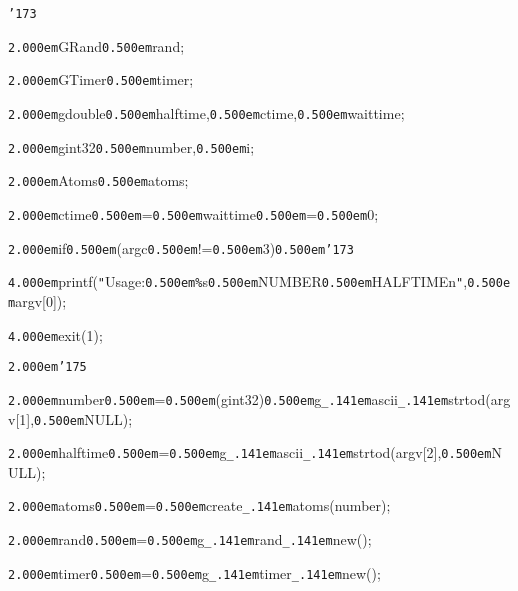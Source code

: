 \noindent
{}{\tt\char'173}

\noindent
{}{\tt\mc \kern2.000em}GRand{\tt\mc \kern0.500em}{\tt *}rand;

\noindent
{}{\tt\mc \kern2.000em}GTimer{\tt\mc \kern0.500em}{\tt *}timer;

\noindent
{}{\tt\mc \kern2.000em}gdouble{\tt\mc \kern0.500em}halftime,{\tt\mc \kern0.500em}ctime,{\tt\mc \kern0.500em}waittime;

\noindent
{}{\tt\mc \kern2.000em}gint32{\tt\mc \kern0.500em}number,{\tt\mc \kern0.500em}i;

\noindent
{}{\tt\mc \kern2.000em}Atoms{\tt\mc \kern0.500em}{\tt *}atoms;

\noindent
{}\hfill

\noindent
{}{\tt\mc \kern2.000em}ctime{\tt\mc \kern0.500em}={\tt\mc \kern0.500em}waittime{\tt\mc \kern0.500em}={\tt\mc \kern0.500em}0;

\noindent
{}\hfill

\noindent
{}{\tt\mc \kern2.000em}if{\tt\mc \kern0.500em}(argc{\tt\mc \kern0.500em}!={\tt\mc \kern0.500em}3){\tt\mc \kern0.500em}{\tt\char'173}

\noindent
{}{\tt\mc \kern4.000em}printf({\tt "}Usage:{\tt\mc \kern0.500em}{\tt\%}s{\tt\mc \kern0.500em}NUMBER{\tt\mc \kern0.500em}HALFTIME{\tt{}}n{\tt "},{\tt\mc \kern0.500em}argv[0]);

\noindent
{}{\tt\mc \kern4.000em}exit(1);

\noindent
{}{\tt\mc \kern2.000em}{\tt\char'175}

\noindent
{}\hfill

\noindent
{}{\tt\mc \kern2.000em}number{\tt\mc \kern0.500em}={\tt\mc \kern0.500em}(gint32){\tt\mc \kern0.500em}g{\tt\_\kern.141em}ascii{\tt\_\kern.141em}strtod(argv[1],{\tt\mc \kern0.500em}NULL);

\noindent
{}{\tt\mc \kern2.000em}halftime{\tt\mc \kern0.500em}={\tt\mc \kern0.500em}g{\tt\_\kern.141em}ascii{\tt\_\kern.141em}strtod(argv[2],{\tt\mc \kern0.500em}NULL);

\noindent
{}\hfill

\noindent
{}{\tt\mc \kern2.000em}atoms{\tt\mc \kern0.500em}={\tt\mc \kern0.500em}create{\tt\_\kern.141em}atoms(number);

\noindent
{}\hfill

\noindent
{}{\tt\mc \kern2.000em}rand{\tt\mc \kern0.500em}={\tt\mc \kern0.500em}g{\tt\_\kern.141em}rand{\tt\_\kern.141em}new();

\noindent
{}{\tt\mc \kern2.000em}timer{\tt\mc \kern0.500em}={\tt\mc \kern0.500em}g{\tt\_\kern.141em}timer{\tt\_\kern.141em}new();

